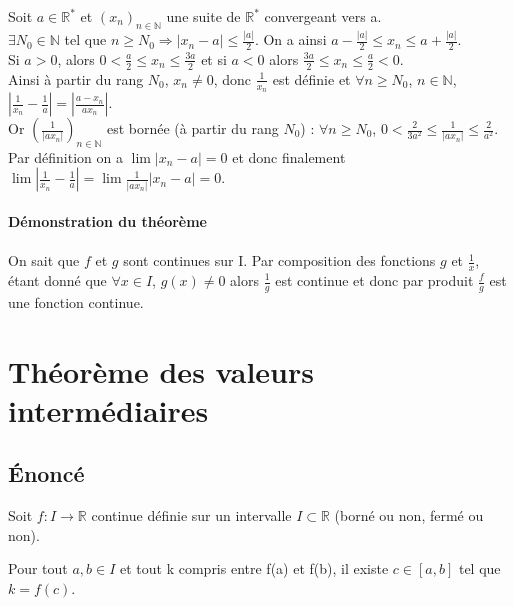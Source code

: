 \documentclass[a4paper,10pt]{book} %
\newcommand{\R}{\mathbb{R}}
\newcommand{\N}{\mathbb{N}}
\begin{document}
Soit $a \in \R^{*}$ et $(x_{n})_{n\in\N}$ une suite de $\R^{*}$ convergeant vers a.\\
$\exists N_{0}\in\N$ tel que $n\geq N_{0} \Rightarrow |x_{n}-a|\leq \frac{|a|}{2}$. On a ainsi $a-\frac{|a|}{2}\leq x_{n}\leq a+\frac{|a|}{2}$.\\

Si $a>0$, alors $0<\frac{a}{2}\leq x_{n} \leq \frac{3a}{2}$ et si $a <0$ alors $\frac{3a}{2}\leq x_{n}\leq \frac{a}{2}<0$.\\

Ainsi à partir du rang $N_{0}$, $x_{n}\neq 0$, donc $\frac{1}{x_{n}}$ est définie et $\forall n\geq N_{0}$, $n\in \N$, $|\frac{1}{x_{n}}-\frac{1}{a}|=|\frac{a-x_{n}}{ax_{n}}|$.\\
Or $(\frac{1}{|ax_{n}|})_{n\in\N}$ est bornée (à partir du rang $N_{0}$) : $\forall n\geq N_{0}$, $0<\frac{2}{3a^{2}}\leq \frac{1}{|ax_{n}|}\leq \frac{2}{a^{2}}$.\\

Par définition on a $\lim |x_{n}-a|=0$ et donc finalement $\lim|\frac{1}{x_{n}}-\frac{1}{a}|=\lim\frac{1}{|ax_{n}|}|x_{n}-a|=0$.\\\\

\textbf{Démonstration du théorème}\\\\
On sait que $f$ et $g$ sont continues sur I. Par composition des fonctions $g$ et $\frac{1}{x}$, étant donné que $\forall x\in I$, $g(x)\neq 0$ alors $\frac{1}{g}$ est continue et donc par produit $\frac{f}{g}$ est une fonction continue.

\newpage

\section{Théorème des valeurs intermédiaires}
\subsection{Énoncé}
Soit $f:I\rightarrow \R$ continue définie sur un intervalle $I\subset \R$ (borné ou non, fermé ou non).

Pour tout $a,b\in I$ et tout k compris entre f(a) et f(b), il existe $c\in[a,b]$ tel que $k=f(c)$.
\end{document}
